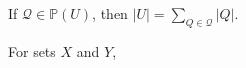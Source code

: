 If $\mathcal{Q} \in \mathbb{P}(U)$, then $|U| = \sum_{Q \in \mathcal{Q}} |Q|$.

For sets $X$ and $Y$,
